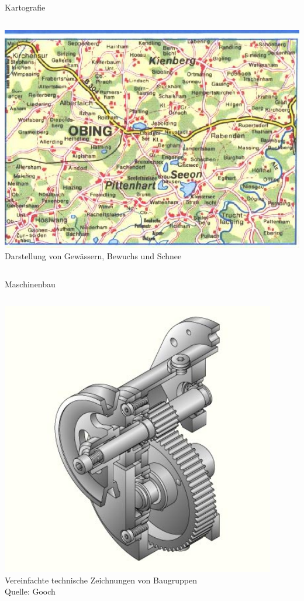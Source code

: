 \begin{frame}{Kartografie}
  \begin{columns}
	\includegraphics[width=\textwidth]{../images/landkarte.jpg}
	Darstellung von Gewässern, Bewuchs und Schnee
  \end{columns}
\end{frame}

\begin{frame}{Maschinenbau}
  \begin{columns}
	\includegraphics[width=0.9\textwidth]{../images/schnitt.jpg}
	Vereinfachte technische Zeichnungen von Baugruppen\\
	Quelle: Gooch
  \end{columns}
\end{frame}